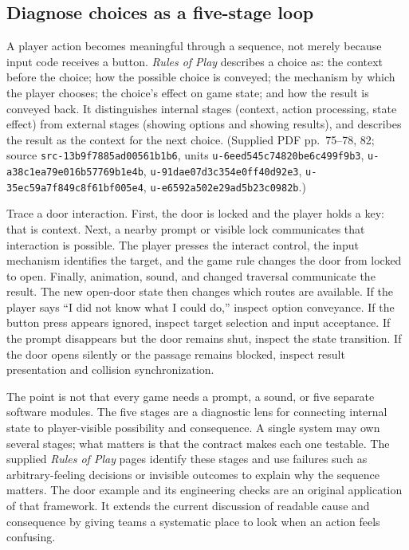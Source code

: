 \subsection{Diagnose choices as a five-stage loop}\label{diagnose-choices-as-a-five-stage-loop}

A player action becomes meaningful through a sequence, not merely because input code receives a button. \emph{Rules of Play} describes a choice as: the context before the choice; how the possible choice is conveyed; the mechanism by which the player chooses; the choice's effect on game state; and how the result is conveyed back. It distinguishes internal stages (context, action processing, state effect) from external stages (showing options and showing results), and describes the result as the context for the next choice. (Supplied PDF pp.~75--78, 82; source \texttt{src-13b9f7885ad00561b1b6}, units \texttt{u-6eed545c74820be6c499f9b3}, \texttt{u-a38c1ea79e016b57769b1e4b}, \texttt{u-91dae07d3c354e0ff40d92e3}, \texttt{u-35ec59a7f849c8f61bf005e4}, \texttt{u-e6592a502e29ad5b23c0982b}.)

Trace a door interaction. First, the door is locked and the player holds a key: that is context. Next, a nearby prompt or visible lock communicates that interaction is possible. The player presses the interact control, the input mechanism identifies the target, and the game rule changes the door from locked to open. Finally, animation, sound, and changed traversal communicate the result. The new open-door state then changes which routes are available. If the player says ``I did not know what I could do,'' inspect option conveyance. If the button press appears ignored, inspect target selection and input acceptance. If the prompt disappears but the door remains shut, inspect the state transition. If the door opens silently or the passage remains blocked, inspect result presentation and collision synchronization.

The point is not that every game needs a prompt, a sound, or five separate software modules. The five stages are a diagnostic lens for connecting internal state to player-visible possibility and consequence. A single system may own several stages; what matters is that the contract makes each one testable. The supplied \emph{Rules of Play} pages identify these stages and use failures such as arbitrary-feeling decisions or invisible outcomes to explain why the sequence matters. The door example and its engineering checks are an original application of that framework. It extends the current discussion of readable cause and consequence by giving teams a systematic place to look when an action feels confusing.

